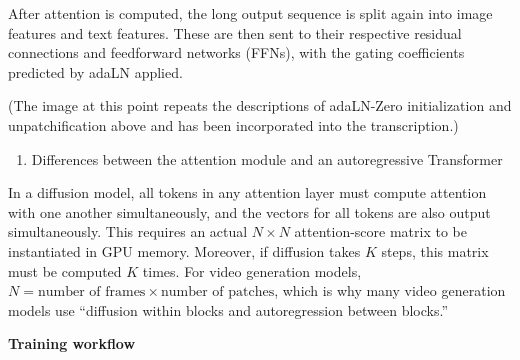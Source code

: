 After attention is computed, the long output sequence is split again into image features and text features. These are then sent to their respective residual connections and feedforward networks (FFNs), with the gating coefficients predicted by adaLN applied.

(The image at this point repeats the descriptions of adaLN-Zero initialization and unpatchification above and has been incorporated into the transcription.)

\begin{enumerate}
\def\labelenumi{\arabic{enumi}.}
\setcounter{enumi}{3}
\tightlist
\item
  Differences between the attention module and an autoregressive Transformer
\end{enumerate}

In a diffusion model, all tokens in any attention layer must compute attention with one another simultaneously, and the vectors for all tokens are also output simultaneously. This requires an actual \(N\times N\) attention-score matrix to be instantiated in GPU memory. Moreover, if diffusion takes \(K\) steps, this matrix must be computed \(K\) times. For video generation models, \(N=\text{number of frames}\times\text{number of patches}\), which is why many video generation models use ``diffusion within blocks and autoregression between blocks.''

\textbf{Training workflow}

